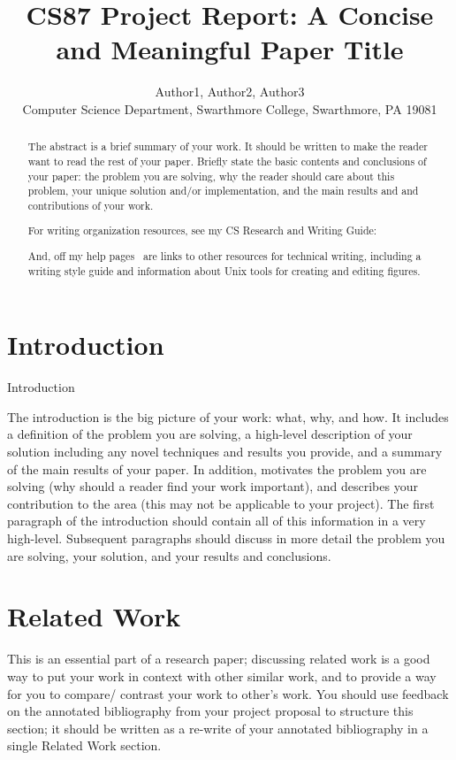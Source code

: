 \documentclass[11pt,twocolumn]{article}
\begin{document}
\title{CS87 Project Report: 
A Concise and Meaningful Paper Title}

\author{Author1, Author2, Author3 \\
Computer Science Department, Swarthmore College, Swarthmore, PA  19081}

\maketitle

\begin{abstract}

The abstract is a brief summary of your work. It should be written to make the
reader want to read the rest of your paper. Briefly state the basic contents
and conclusions of your paper: the problem you are solving, why the reader
should care about this problem, your unique solution and/or implementation,
and the main results and and contributions of your work.

  For writing organization resources, see my
  CS Research and Writing Guide:


And, off my help pages~\cite{newhall:help} are links to other resources 
for technical writing, including a writing style guide and information
about Unix tools for creating and editing figures.  

\end{abstract}


\section {Introduction} 

Introduction 


The introduction is the big picture of your work: what, why, and how. It
includes a definition of the problem you are solving, a high-level description
of your solution including any novel techniques and results you provide, and a
summary of the main results of your paper. In addition, motivates the problem
you are solving (why should a reader find your work important), and describes
your contribution to the area (this may not be applicable to your project).
The first paragraph of the introduction should contain all of this information
in a very high-level. Subsequent paragraphs should discuss in more detail the
problem you are solving, your solution, and your results and conclusions.


\section {Related Work}\label{relwork}
This is an essential part of a research paper; discussing related work is a
good way to put your work in context with other similar work, and to provide a
way for you to compare/ contrast your work to other's work.  You should use
feedback on the annotated bibliography from your project proposal to structure
this section; it should be written as a re-write of your annotated bibliography
in a single Related Work section.
\end{document}
